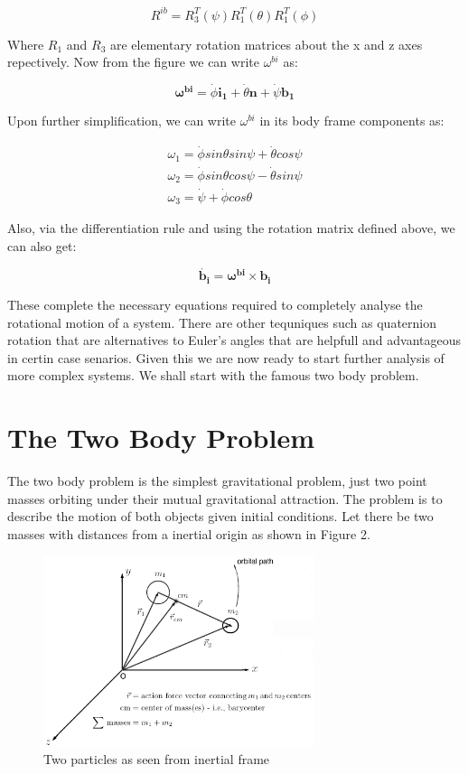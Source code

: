 \documentclass[12pt, letterpaper]{article}
\begin{document}
\begin{displaymath}
R^{ib} = R_3^{T}(\psi)R_1^{T}(\theta)R_1^{T}(\phi)
\end{displaymath}

Where $R_1$ and $R_3$ are elementary rotation matrices about the x and z axes repectively. Now from the figure we can write $\omega^{bi}$ as:

\begin{displaymath}
\mathbf{\omega^{bi}} = \dot{\phi}\mathbf{i_1} + \dot{\theta}\mathbf{n} + \dot{\psi}\mathbf{b_1}
\end{displaymath}

Upon further simplification, we can write $\omega^{bi}$ in its body frame components as:

\begin{gather*}
\omega_1 = \dot{\phi}sin{\theta}sin{\psi} + \dot{\theta}cos\psi\\
\omega_2 = \dot{\phi}sin{\theta}cos{\psi} - \dot{\theta}sin\psi\\
\omega_3 = \dot{\psi} + \dot{\phi}cos\theta
\end{gather*}

Also, via the differentiation rule and using the rotation matrix defined above, we can also get:

\begin{displaymath}
\dot{\mathbf{b_i}} = \mathbf{\omega^{bi}}\times\mathbf{b_i}
\end{displaymath}

These complete the necessary equations required to completely analyse the rotational motion of a system. There are other tequniques such as quaternion rotation that are alternatives to Euler's angles that are helpfull and advantageous in certin case senarios. Given this we are now ready to start further analysis of more complex systems. We shall start with the famous two body problem.

\newpage
\section{The Two Body Problem}
 The two body problem is the simplest gravitational problem, just two point masses orbiting under their mutual gravitational attraction. The problem is to describe the motion of both objects given initial conditions. Let there be two masses with distances from a inertial origin as shown in Figure 2.

\begin{figure}[h]
	\centering
    \includegraphics[width = 300px]{Twobodies}
    \caption{Two particles as seen from inertial frame}
\end{figure}
\end{document}
